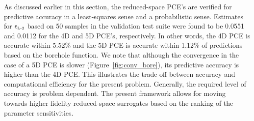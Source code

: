 As discussed earlier in this section, the reduced-space PCE's are verified for
predictive accuracy in a least-squares sense and a probabilistic sense.
Estimates for $\epsilon_{\mbox{\tiny{L-2}}}$ based on 50 samples in the
validation test suite were
found to be 0.0551 and 0.0112 for the 4D and 5D PCE's, respectively. In other
words, the 4D PCE is accurate within 5.52$\%$ and the 5D PCE is accurate within
1.12$\%$ of predictions based on the borehole function. We note  that although
the convergence in the case of a 5D PCE is slower (Figure~\ref{fig:conv_bore}),
its predictive accuracy is higher than the 4D PCE. This illustrates the
trade-off between accuracy and computational efficiency for the present 
problem. Generally, the required level of accuracy is problem dependent. 
The present framework allows for moving towards higher fidelity 
reduced-space surrogates based on the ranking of the parameter sensitivities. 
 


